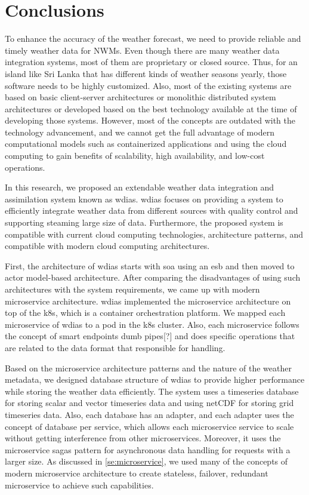 \section{Conclusions}
\label{se:summary_conclusion}

To enhance the accuracy of the weather forecast, we need to provide reliable and timely weather data for NWMs. Even though there are many weather data integration systems, most of them are proprietary or closed source. Thus, for an island like Sri Lanka that has different kinds of weather seasons yearly, those software needs to be highly customized. Also, most of the existing systems are based on basic client-server architectures or monolithic distributed system architectures or developed based on the best technology available at the time of developing those systems. However, most of the concepts are outdated with the technology advancement, and we cannot get the full advantage of modern computational models such as containerized applications and using the cloud computing to gain benefits of scalability, high availability, and low-cost operations.

In this research, we proposed an extendable weather data integration and assimilation system known as \acrfull{wdias}. \acrshort{wdias} focuses on providing a system to efficiently integrate weather data from different sources with quality control and supporting steaming large size of data. Furthermore, the proposed system is compatible with current cloud computing technologies, architecture patterns, and compatible with modern cloud computing architectures.

First, the architecture of \acrshort{wdias} starts with \acrshort{soa} using an \acrfull{esb} and then moved to actor model-based architecture. After comparing the disadvantages of using such architectures with the system requirements, we came up with modern microservice architecture. \acrshort{wdias} implemented the microservice architecture on top of the \acrshort{k8s}, which is a container orchestration platform. We mapped each microservice of \acrshort{wdias} to a pod in the \acrshort{k8s} cluster. Also, each microservice follows the concept of smart endpoints dumb pipes[?] and does specific operations that are related to the data format that responsible for handling.

Based on the microservice architecture patterns and the nature of the weather metadata, we designed database structure of \acrshort{wdias} to provide higher performance while storing the weather data efficiently. The system uses a timeseries database for storing scalar and vector timeseries data and using netCDF for storing grid timeseries data. Also, each database has an adapter, and each adapter uses the concept of database per service, which allows each microservice service to scale without getting interference from other microservices.
Moreover, it uses the microservice sagas pattern for asynchronous data handling for requests with a larger size. As discussed in \cref{se:microservice}, we used many of the concepts of modern microservice architecture to create stateless, failover, redundant microservice to achieve such capabilities.


